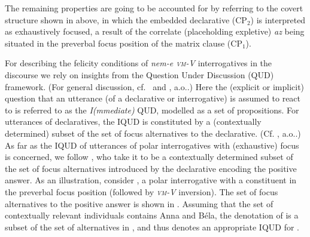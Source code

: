 \documentclass[output=paper,colorlinks,citecolor=brown]{langscibook}
\begin{document}
	The remaining properties  are going to be accounted for by referring to the covert structure shown in   above,  in which the embedded declarative (CP$_2$) is interpreted as exhaustively focused, a result of  the correlate (placeholding  expletive) \textit{az} being situated in the preverbal focus position of the  matrix clause (CP$_1$). 
	
	For describing the  felicity conditions of \textit{nem-e \textsc{vm}-V} interrogatives in the  discourse we rely on insights from the Question Under Discussion (QUD) framework. (For general discussion, cf.~ \citealt{roberts2012} and \citealt{buring2003}, a.o..)  Here  the (explicit or implicit) question that an utterance (of a  declarative or interrogative) is assumed to  react to is referred to as the \textit{I(mmediate)} QUD, modelled as a set of propositions. For  utterances of declaratives, the  IQUD  is constituted by a (contextually determined) subset of the set of focus alternatives to the declarative. (Cf. \citealt{rooth1992, beaver+clark}, a.o..) As far as the IQUD of utterances of polar interrogatives with (exhaustive) focus is concerned, we follow \citet[26--27]{kamali+krifka}, who take it  to be a contextually determined subset of the set of focus alternatives introduced by the declarative encoding the positive answer. As an illustration, consider ,  a polar interrogative with a constituent in the preverbal focus position (followed by \textit{\textsc{vm}-V} inversion). The set of focus alternatives to the positive answer is shown in . Assuming that the set of contextually relevant individuals contains Anna and Béla, the denotation of  is a  subset of the set of alternatives in , and thus  denotes  an appropriate IQUD for .
	
	\ea\label{ex:ali+ali_answer}
	\label{ex:ali}
	\label{ex:ali_alt}
	\label{ex:ali_qud}
	\z
	\z
	
\end{document}
